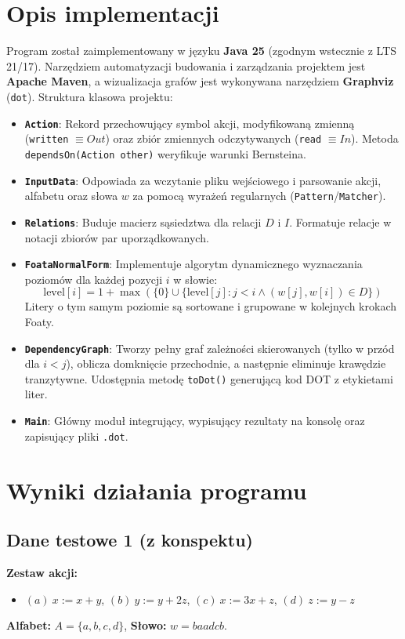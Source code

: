 \documentclass[a4paper,11pt]{article}
\begin{document}
\section{Opis implementacji}
Program został zaimplementowany w języku \textbf{Java 25} (zgodnym wstecznie z LTS 21/17). Narzędziem automatyzacji budowania i zarządzania projektem jest \textbf{Apache Maven}, a wizualizacja grafów jest wykonywana narzędziem \textbf{Graphviz} (\texttt{dot}).
Struktura klasowa projektu:
\begin{itemize}
    \item \textbf{\texttt{Action}}: Rekord przechowujący symbol akcji, modyfikowaną zmienną (\texttt{written} $\equiv Out$) oraz zbiór zmiennych odczytywanych (\texttt{read} $\equiv In$). Metoda \texttt{dependsOn(Action other)} weryfikuje warunki Bernsteina.
    \item \textbf{\texttt{InputData}}: Odpowiada za wczytanie pliku wejściowego i parsowanie akcji, alfabetu oraz słowa $w$ za pomocą wyrażeń regularnych (\texttt{Pattern}/\texttt{Matcher}).
    \item \textbf{\texttt{Relations}}: Buduje macierz sąsiedztwa dla relacji $D$ i $I$. Formatuje relacje w notacji zbiorów par uporządkowanych.
    \item \textbf{\texttt{FoataNormalForm}}: Implementuje algorytm dynamicznego wyznaczania poziomów dla każdej pozycji $i$ w słowie:
    \[
    \text{level}[i] = 1 + \max \left(\{0\} \cup \{ \text{level}[j] : j < i \land (w[j], w[i]) \in D \}\right)
    \]
    Litery o tym samym poziomie są sortowane i grupowane w kolejnych krokach Foaty.
    \item \textbf{\texttt{DependencyGraph}}: Tworzy pełny graf zależności skierowanych (tylko w przód dla $i < j$), oblicza domknięcie przechodnie, a następnie eliminuje krawędzie tranzytywne. Udostępnia metodę \texttt{toDot()} generującą kod DOT z etykietami liter.
    \item \textbf{\texttt{Main}}: Główny moduł integrujący, wypisujący rezultaty na konsolę oraz zapisujący pliki \texttt{.dot}.
\end{itemize}

\newpage
\section{Wyniki działania programu}

\subsection{Dane testowe 1 (z konspektu)}
\textbf{Zestaw akcji:}
\begin{itemize}
    \item $(a)\ x := x + y$, \quad $(b)\ y := y + 2z$, \quad $(c)\ x := 3x + z$, \quad $(d)\ z := y - z$
\end{itemize}
\textbf{Alfabet:} $A = \{a, b, c, d\}$, \quad \textbf{Słowo:} $w = baadcb$.
\end{document}
